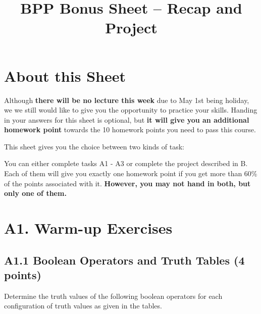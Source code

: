 


\title{BPP Bonus Sheet -- Recap and Project}




\section*{About this Sheet}

Although \textbf{there will be no lecture this week} due to May 1st being holiday, we we still would like to give you the opportunity to practice your skills.
Handing in your answers for this sheet is optional, but \textbf{it will give you an additional homework point} towards the 10 homework points you need to pass this course.

\vspace{1em}

\noindent This sheet gives you the choice between two kinds of task:

\vspace{1em}

\noindent You can either complete tasks A1 - A3 or complete the project described in B. Each of them will give you exactly one homework point if you get more than 60\% of the points associated with it. \newline \textbf{However, you may not hand in both, but only one of them.}

\section*{A1. Warm-up Exercises}

\subsection*{A1.1 Boolean Operators and Truth Tables (4 points)}

\vspace{1em}

\noindent Determine the truth values of the following boolean operators for each configuration of truth values as given in the tables.

\vspace{1em}


